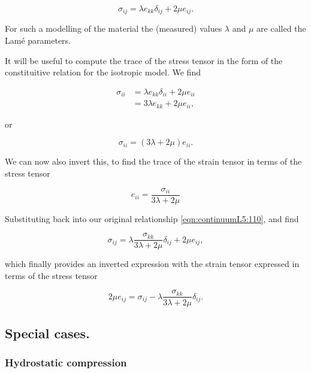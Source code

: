 \begin{equation}\label{eqn:continuumL5:110}
\boxed{
\sigma_{ij} = \lambda e_{kk} \delta_{ij} + 2 \mu e_{ij}.
}
\end{equation}

For such a modelling of the material the (measured) values $\lambda$ and $\mu$ are called the Lam\'e parameters.

It will be useful to compute the trace of the stress tensor in the form of the constituitive relation for the isotropic model.  We find

\begin{align*}
\sigma_{ii}
&= \lambda e_{kk} \delta_{ii} + 2 \mu e_{ii} \\
&= 3 \lambda e_{kk} + 2 \mu e_{ii},
\end{align*}

or

\begin{equation}\label{eqn:continuumL5:n}
\sigma_{ii} = (3 \lambda + 2 \mu) e_{ii}.
\end{equation}

We can now also invert this, to find the trace of the strain tensor in terms of the stress tensor

\begin{equation}\label{eqn:continuumL5:130}
e_{ii} = \frac{\sigma_{ii}}{3 \lambda + 2 \mu}
\end{equation}

Substituting back into our original relationship \ref{eqn:continuumL5:110}, and find

\begin{equation}\label{eqn:continuumL5:110b}
\sigma_{ij} = \lambda \frac{\sigma_{kk}}{3 \lambda + 2 \mu} \delta_{ij} + 2 \mu e_{ij},
\end{equation}

which finally provides an inverted expression with the strain tensor expressed in terms of the stress tensor

\begin{equation}\label{eqn:continuumL5:110b}
2 \mu e_{ij} =
\sigma_{ij} - \lambda \frac{\sigma_{kk}}{3 \lambda + 2 \mu} \delta_{ij}.
\end{equation}

\subsection{Special cases.}
\subsubsection{Hydrostatic compression}

